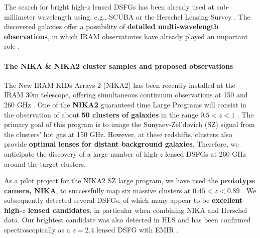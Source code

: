 \documentclass[11pt,a4paper,twoside,graphicx,color]{article}
\begin{document}
The search for bright high-$z$ lensed DSFGs has been already used at sub-millimeter wavelength using, e.g., SCUBA \citep{Knudsen2006} or the Herschel Lensing Survey \citep[HLS,][]{Egami2010}. The discovered galaxies offer a possibility of {\bf detailed multi-wavelength observations}, in which IRAM observatories have already played an important role \citep[e.g., a $z=5.2$ galaxy behind Abell 773,][]{Combes2012}.

\paragraph{\large The NIKA \& NIKA2 cluster samples and proposed observations}
The New IRAM KIDs Arrays 2 (NIKA2) has been recently installed at the IRAM 30m telescope, offering simultaneous continuum observations at 150 and 260 GHz \citep{Catalano2016}. One of the {\bf NIKA2} guaranteed time Large Programs will consist in the observation of about {\bf 50 clusters of galaxies} in the range $0.5 < z < 1$ \citep{Comis2016}. The primary goal of this program is to image the Sunyaev-Zel'dovich (SZ) signal from the clusters' hot gas at 150 GHz. However, at these redshifts, clusters also provide {\bf optimal lenses for distant background galaxies}. Therefore, we anticipate the discovery of a large number of high-$z$ lensed DSFGs at 260 GHz around the target clusters.

As a pilot project for the NIKA2 SZ large program, we have used the {\bf prototype camera, NIKA}, to successfully map six massive clusters at $0.45 < z < 0.89$ \citep{Adam2014,Adam2015,Adam2016a,Adam2016b,Ruppin2016}. We subsequently detected several DSFGs, of which many appear to be {\bf excellent high-$z$ lensed candidates}, in particular when combining NIKA and Herschel data. Our brightest candidate \citep[lensed by \mbox{CL~J1226.9+3332} at $z=0.89$,][]{Adam2015} was also detected in HLS and has been confirmed spectroscopically as a $z$$=$$2.4$ lensed DSFG with EMIR \citep{Egami}.
\end{document}
